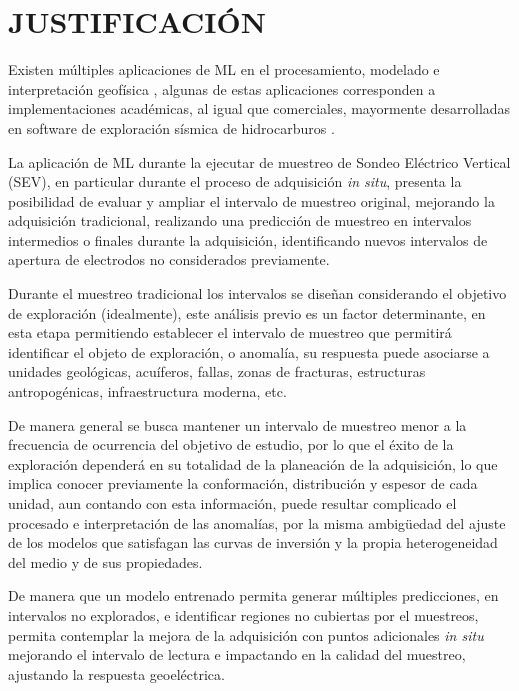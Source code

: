\chapter{JUSTIFICACIÓN}

Existen múltiples aplicaciones de ML en el procesamiento, modelado e interpretación geofísica \citep{li2024, liu2020,el2001,wrona2018}, algunas de estas aplicaciones corresponden a implementaciones académicas, al igual que comerciales, mayormente desarrolladas en software de exploración sísmica de hidrocarburos \citep{diaferia2024high, panebianco2024automated}.



La aplicación de ML durante la ejecutar de muestreo de Sondeo Eléctrico Vertical (SEV), en particular durante el proceso de adquisición \textit{in situ}, presenta la posibilidad de evaluar y ampliar el intervalo de muestreo original, mejorando la adquisición tradicional, realizando una predicción de muestreo en intervalos intermedios o finales durante la adquisición, identificando nuevos intervalos de apertura de electrodos no considerados previamente.

Durante el muestreo tradicional los intervalos se diseñan considerando el objetivo de exploración (idealmente), este análisis previo es un factor determinante, en esta etapa permitiendo establecer el intervalo de muestreo que permitirá identificar el objeto de exploración, o anomalía, su respuesta puede asociarse a unidades geológicas, acuíferos, fallas, zonas de fracturas, estructuras antropogénicas, infraestructura moderna, etc.

De manera general se busca mantener un intervalo de muestreo menor a la frecuencia de ocurrencia del objetivo de estudio, por lo que el éxito de la exploración dependerá en su totalidad de la planeación de la adquisición, lo que implica conocer previamente la conformación, distribución y espesor de cada unidad, aun contando con esta información, puede resultar complicado el procesado e  interpretación de las anomalías, por la misma ambigüedad del ajuste de los modelos que satisfagan las curvas de inversión y la propia heterogeneidad del medio y de sus propiedades.

De manera que un modelo entrenado permita generar múltiples predicciones, en intervalos no explorados, e identificar regiones no cubiertas por el muestreos, permita contemplar la mejora de la adquisición con puntos adicionales \textit{in situ} mejorando el intervalo de lectura e impactando en la calidad del muestreo, ajustando la respuesta geoeléctrica.

